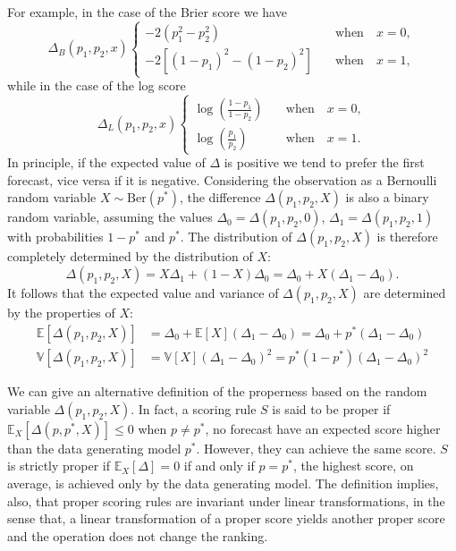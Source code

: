 \documentclass[referee,sn-basic]{sn-jnl}
\theoremstyle{thmstyleone}%
\theoremstyle{thmstyletwo}%
\theoremstyle{thmstylethree}%
\begin{document}
For example, in the case of the Brier score we have
\begin{equation}
    \Delta_B(p_1,p_2,x)
    \begin{cases}
    -2(p_1^2 - p_2^2) &\quad \text{when} \quad x = 0,  \\
    -2[(1-p_1)^2 - (1-p_2)^2] &\quad \text{when} \quad x = 1,
    \end{cases}
    \label{eq:brier_diff}
\end{equation}
while in the case of the log score 
\begin{equation}
    \Delta_L(p_1,p_2,x)
    \begin{cases}
    \log(\frac{1-p_1}{1-p_2}) &\quad \text{when} \quad x = 0,  \\
    \log(\frac{p_1}{p_2}) &\quad \text{when} \quad x = 1.
    \end{cases}
    \label{eq:log_diff}
\end{equation}
In principle, if the expected value of $\Delta$ is positive we tend to prefer the first forecast, vice versa if it is negative. Considering the observation as a Bernoulli random variable $X \sim \text{Ber}(p^*)$, the difference $\Delta(p_1,p_2,X)$ is also a binary random variable, assuming the values $\Delta_0 = \Delta(p_1,p_2,0)$, $\Delta_1 = \Delta(p_1,p_2,1)$ with probabilities $1-p^*$ and $p^*$. The distribution of $\Delta(p_1, p_2, X)$ is therefore completely determined by the distribution of $X$:
\begin{equation}
\Delta(p_1, p_2, X) = X\Delta_1 + (1 - X)\Delta_0 = \Delta_0 + X(\Delta_1 - \Delta_0). 
\label{eq:delta_def}
\end{equation}
It follows that the expected value and variance of $\Delta(p_1, p_2, X)$ are determined by the properties of $X$:
\begin{align}
\mathbb E[\Delta(p_1, p_2, X)] &= \Delta_0 + \mathbb E[X](\Delta_1 - \Delta_0) = \Delta_0 + p^*(\Delta_1 - \Delta_0)
\label{eq:ex_value}
\\
\mathbb V[\Delta(p_1, p_2, X)] &= \mathbb V[X](\Delta_1 - \Delta_0)^2 = p^*(1- p^*)(\Delta_1 - \Delta_0)^2
\label{eq:variance}
\end{align}

We can give an alternative definition of the properness based on the random variable $\Delta(p_1,p_2,X)$. In fact, a scoring rule $S$ is said to be proper if $\mathbb E_X[\Delta(p, p^*, X)] \leq 0$ when $p \neq p^*$, no forecast have an expected score higher than the data generating model $p^*$. However, they can achieve the same score. $S$ is strictly proper if $\mathbb E_X[\Delta] = 0$ if and only if $p = p^*$, the highest score, on average, is achieved only by the data generating model. The definition implies, also, that proper scoring rules are invariant under linear transformations, in the sense that, a linear transformation of a proper score yields another proper score and the operation does not change the ranking.
\end{document}
